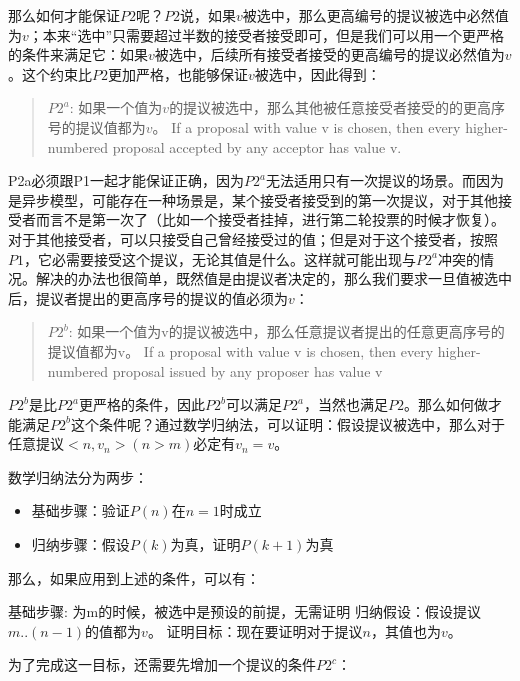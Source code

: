 \documentclass[12pt]{article}
\begin{document}
那么如何才能保证\(P2\)呢？\(P2\)说，如果\(v\)被选中，那么更高编号的提议被选中必然值为\(v\)；本来``选中''只需要超过半数的接受者接受即可，但是我们可以用一个更严格的条件来满足它：如果\(v\)被选中，后续所有接受者接受的更高编号的提议必然值为\(v\)。这个约束比\(P2\)更加严格，也能够保证\(v\)被选中，因此得到：

\begin{quote}
\(P2^{a}\): 如果一个值为\(v\)的提议被选中，那么其他被任意接受者接受的的更高序号的提议值都为\(v\)。 If a proposal with value v is chosen, then every higher-numbered proposal accepted by any acceptor has value v.
\end{quote}

P2a必须跟P1一起才能保证正确，因为\(P2^{a}\)无法适用只有一次提议的场景。而因为是异步模型，可能存在一种场景是，某个接受者接受到的第一次提议，对于其他接受者而言不是第一次了（比如一个接受者挂掉，进行第二轮投票的时候才恢复）。对于其他接受者，可以只接受自己曾经接受过的值；但是对于这个接受者，按照\(P1\)，它必需要接受这个提议，无论其值是什么。这样就可能出现与\(P2^{a}\)冲突的情况。解决的办法也很简单，既然值是由提议者决定的，那么我们要求一旦值被选中后，提议者提出的更高序号的提议的值必须为\(v\)：

\begin{quote}
\(P2^{b}\): 如果一个值为v的提议被选中，那么任意提议者提出的任意更高序号的提议值都为v。 If a proposal with value v is chosen, then every higher-numbered proposal issued by any proposer has value v
\end{quote}

\(P2^{b}\)是比\(P2^{a}\)更严格的条件，因此\(P2^{b}\)可以满足\(P2^{a}\)，当然也满足\(P2\)。那么如何做才能满足\(P2^{b}\)这个条件呢？通过数学归纳法，可以证明：假设提议\(<m, v>\)被选中，那么对于任意提议\(<n, v_{n}>(n> m)\)必定有\(v_{n}=v\)。

数学归纳法分为两步：

\begin{itemize}
\tightlist
\item
  基础步骤：验证\(P(n)\)在\(n=1\)时成立
\item
  归纳步骤：假设\(P(k)\)为真，证明\(P(k + 1)\)为真
\end{itemize}

那么，如果应用到上述的条件，可以有：

基础步骤: 为m的时候，\(<m, v>\)被选中是预设的前提，无需证明 归纳假设：假设提议\(m..(n-1)\)的值都为\(v\)。 证明目标：现在要证明对于提议\(n\)，其值也为\(v\)。

为了完成这一目标，还需要先增加一个提议的条件\(P2^{c}\)：
\end{document}
